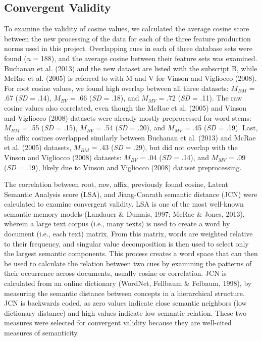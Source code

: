 \documentclass[english,,man]{apa6}
\theoremstyle{definition}
\theoremstyle{definition}
\theoremstyle{definition}
\theoremstyle{remark}
\begin{document}
\subsection{Convergent Validity}\label{convergent-validity}

To examine the validity of cosine values, we calculated the average
cosine score between the new processing of the data for each of the
three feature production norms used in this project. Overlapping cues in
each of three database sets were found (\emph{n} = 188), and the average
cosine between their feature sets was examined. Buchanan et al. (2013)
and the new dataset are listed with the subscript B, while McRae et al.
(2005) is referred to with M and V for Vinson and Vigliocco (2008). For
root cosine values, we found high overlap between all three datasets:
\(M_{BM}\) = .67 (\emph{SD} = .14), \(M_{BV}\) = .66 (\emph{SD} = .18),
and \(M_{MV}\) = .72 (\emph{SD} = .11). The raw cosine values also
correlated, even though the McRae et al. (2005) and Vinson and Vigliocco
(2008) datasets were already mostly preprocessed for word stems:
\(M_{BM}\) = .55 (\emph{SD} = .15), \(M_{BV}\) = .54 (\emph{SD} = .20),
and \(M_{MV}\) = .45 (\emph{SD} = .19). Last, the affix cosines
overlapped similarly between Buchanan et al. (2013) and McRae et al.
(2005) datasets, \(M_{BM}\) = .43 (\emph{SD} = .29), but did not overlap
with the Vinson and Vigliocco (2008) datasets: \(M_{BV}\) = .04
(\emph{SD} = .14), and \(M_{MV}\) = .09 (\emph{SD} = .19), likely due to
Vinson and Vigliocco (2008) dataset preprocessing.

The correlation between root, raw, affix, previously found cosine,
Latent Semantic Analysis score (LSA), and Jiang-Conrath semantic
distance (JCN) were calculated to examine convergent validity. LSA is
one of the most well-known semantic memory models (Landauer \& Dumais,
1997; McRae \& Jones, 2013), wherein a large text corpus (i.e., many
texts) is used to create a word by document (i.e., each text) matrix.
From this matrix, words are weighted relative to their frequency, and
singular value decomposition is then used to select only the largest
semantic components. This process creates a word space that can then be
used to calculate the relation between two cues by examining the
patterns of their occurrence across documents, usually cosine or
correlation. JCN is calculated from an online dictionary (WordNet,
Fellbaum \& Felbaum, 1998), by measuring the semantic distance between
concepts in a hierarchical structure. JCN is backwards coded, as zero
values indicate close semantic neighbors (low dictionary distance) and
high values indicate low semantic relation. These two measures were
selected for convergent validity because they are well-cited measures of
semanticity.
\end{document}
